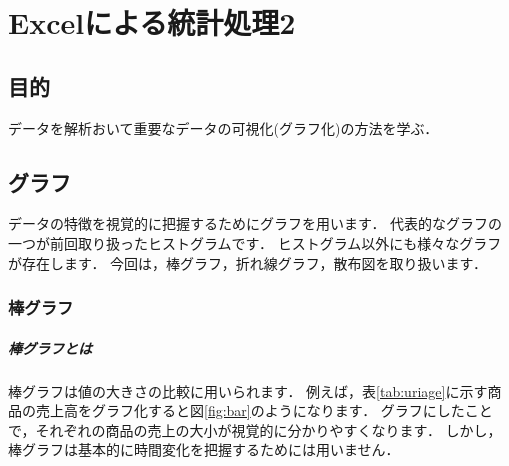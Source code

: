 
\chapter{Excelによる統計処理2}
\setcounter{num_prac}{0}

\section{目的}

データを解析おいて重要なデータの可視化(グラフ化)の方法を学ぶ．

\section{グラフ}

データの特徴を視覚的に把握するためにグラフを用います．
代表的なグラフの一つが前回取り扱ったヒストグラムです．
ヒストグラム以外にも様々なグラフが存在します．
今回は，棒グラフ，折れ線グラフ，散布図を取り扱います．

\subsection{棒グラフ}

\paragraph{棒グラフとは}

棒グラフは値の大きさの比較に用いられます．
例えば，表\ref{tab:uriage}に示す商品の売上高をグラフ化すると図\ref{fig:bar}のようになります．
グラフにしたことで，それぞれの商品の売上の大小が視覚的に分かりやすくなります．
しかし，棒グラフは基本的に時間変化を把握するためには用いません．

